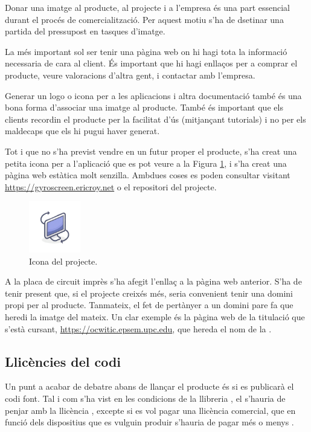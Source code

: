 Donar una imatge al producte, al projecte i a l'empresa és una part essencial
durant el procés de comercialització. Per aquest motiu s'ha de dsetinar una
partida del pressupost en tasques d'imatge.

La més important sol ser tenir una pàgina web on hi hagi tota la informació
necessaria de cara al client. És important que hi hagi enllaços per a comprar el
producte, veure valoracions d'altra gent, i contactar amb l'empresa.

Generar un logo o icona per a les aplicacions i altra documentació també és una
bona forma d'associar una imatge al producte. També és important que els clients
recordin el producte per la facilitat d'ús (mitjançant tutorials) i no per
els maldecaps que els hi pugui haver generat.

Tot i que no s'ha previst vendre en un futur proper el producte, s'ha creat una
petita icona per a l'aplicació que es pot veure a la Figura \ref{fig:icon},
i s'ha creat una pàgina web estàtica molt
senzilla. Ambdues coses es poden consultar visitant
\url{https://gyroscreen.ericroy.net} o el repositori del projecte.

\begin{figure}[ht]
    \centering
    \includegraphics[width=0.2\textwidth]{images/gyroscreen.png}
    \caption{Icona del projecte.}
    \label{fig:icon}
\end{figure}

A la placa de circuit imprès s'ha afegit l'enllaç a la pàgina web anterior.
S'ha de tenir present que, si el projecte creixés més, seria convenient tenir
una domini propi per al producte. Tanmateix, el fet de pertànyer a un domini
pare fa que heredi la imatge del mateix. Un clar exemple és la pàgina web de
la titulació que s'està cursant, \url{https://ocwitic.epsem.upc.edu}, que
hereda el nom de la .

\subsection{Llicències del codi}

Un punt a acabar de debatre abans de llançar el producte és si es publicarà el
codi font. Tal i com s'ha vist en les condicions de la llibreria , el
 s'hauria de penjar amb la llicència , excepte si es
vol pagar una llicència comercial, que en funció dels dispositius que es vulguin
produir s'hauria de pagar més o menys \cite{VusbLicensing}.

